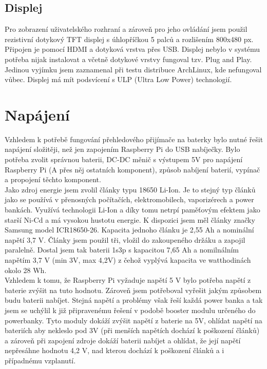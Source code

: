 \documentclass{ctuthesis}
\begin{document}
\subsection{Displej}
Pro zobrazení uživatelského rozhraní a zároveň pro jeho ovládání jsem použil rezistivní dotykový TFT displej s úhlopříčkou 5 palců a rozlišením 800x480 px. Připojen je pomocí HDMI a dotyková vrstva přes USB. Displej nebylo v systému potřeba nijak instalovat a včetně dotykové vrstvy fungoval tzv. Plug and Play. Jedinou vyjímku jsem zaznamenal při testu distribuce ArchLinux, kde nefungoval vůbec. Displej má mít podsvícení s ULP (Ultra Low Power) technologií.


\section{Napájení} \label{power}
Vzhledem k potřebě fungování přehledového přijímače na baterky bylo nutné řešit napájení složitěji, než jen zapojením Raspberry Pi do USB nabíječky. Bylo potřeba zvolit správnou baterii, DC-DC měnič s výstupem 5V pro napájení Raspberry Pi (A přes něj ostatních komponent), způsob nabíjení baterií, vypínač a propojení těchto komponent.\\
 Jako zdroj energie jsem zvolil články typu 18650 Li-Ion. Je to stejný typ článků jako se používá v přenosných počítačích, elektromobilech, vaporizérech a power bankách. Využívá technologii Li-Ion a díky tomu netrpí paměťovým efektem jako starší Ni-Cd a má vysokou hustotu energie. K dispozici jsem měl články značky Samsung model ICR18650-26. Kapacita jednoho článku je 2,55 Ah a nominální napětí 3,7 V. Články jsem použil tři, vložil do zakoupeného držáku a zapojil paralelně. Dostal jsem tak baterii 1s3p s kapacitou 7,65 Ah a nomilnálním napětím 3,7 V (min 3V, max 4,2V) z čehož vyplývá kapacita ve watthodinách okolo 28 Wh.\\
 Vzhledem k tomu, že Raspberry Pi vyžaduje napětí 5 V bylo potřeba napětí z baterie zvýšit na tuto hodnotu. Zároveň jsem potřeboval vyřešit jakým způsobem budu baterii nabíjet. Stejná napětí a problémy však řeší každá power banka a tak jsem se uchýlil k již připravenému řešení v podobě booster modulu určeného do powerbanky. Tyto moduly dokáží zvýšit napětí z baterie na 5V, ohlídat napětí na bateriích aby nekleslo pod 3V (při menších napětích dochází k poškození článků) a zároveň při zapojení zdroje dokáží baterii nabíjet a ohlídat, že její napětí nepřesáhne hodnotu 4,2 V, nad kterou dochází k poškození článků a i případnému vzplanutí.\\
\end{document}
